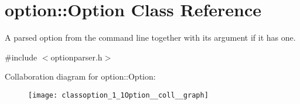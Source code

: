 \hypertarget{classoption_1_1Option}{}\section{option\+:\+:Option Class Reference}
\label{classoption_1_1Option}


A parsed option from the command line together with its argument if it has one.  




{\ttfamily \#include $<$optionparser.\+h$>$}



Collaboration diagram for option\+:\+:Option\+:\nopagebreak
\begin{figure}[H]
\begin{center}
\leavevmode
\texttt{[image: classoption\_1\_1Option\_\_coll\_\_graph]}
\end{center}
\end{figure}
